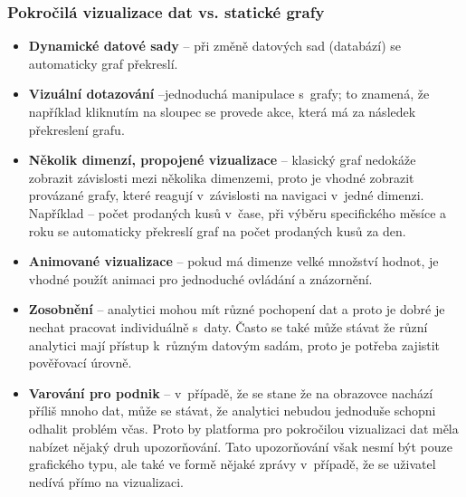 \subsubsection{Pokročilá vizualizace dat vs. statické grafy}
\begin{itemize}
\item \textbf{Dynamické datové sady} -- při změně datových sad (databází) se automaticky graf překreslí.
\item \textbf{Vizuální dotazování} --jednoduchá manipulace s~grafy; to znamená, že například kliknutím na sloupec se provede akce, která má za následek překreslení grafu.
\item \textbf{Několik dimenzí, propojené vizualizace} -- klasický graf nedokáže zobrazit závislosti mezi několika dimenzemi, proto je vhodné zobrazit provázané grafy, které reagují v~závislosti na navigaci v~jedné dimenzi. Například -- počet prodaných kusů v~čase, při výběru specifického měsíce a roku se automaticky překreslí graf na počet prodaných kusů za den.
\item \textbf{Animované vizualizace} -- pokud má dimenze velké množství hodnot, je vhodné použít animaci pro jednoduché ovládání a znázornění.
\item \textbf{Zosobnění} -- analytici mohou mít různé pochopení dat a proto je dobré je nechat pracovat individuálně s~daty. Často se také může stávat že různí analytici mají přístup k~různým datovým sadám, proto je potřeba zajistit pověřovací úrovně.
\item \textbf{Varování pro podnik} -- v~případě, že se stane že na obrazovce nachází příliš mnoho dat, může se stávat, že analytici nebudou jednoduše schopni odhalit problém včas. Proto by platforma pro pokročilou vizualizaci dat měla nabízet nějaký druh upozorňování. Tato upozorňování však nesmí být pouze grafického typu, ale také ve formě nějaké zprávy v~případě, že se uživatel nedívá přímo na vizualizaci. \cite{advanced-data-vizualization-platforms}
\end{itemize}

